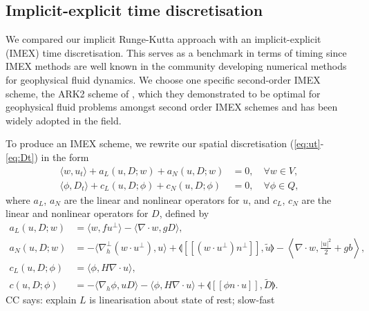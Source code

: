 \documentclass[a4paper, 12pt]{article}
\newcommand{\colin}[1]{{\color{blue}CC says: #1}}
\newcommand{\jump}[1]{[\![#1]\!]}
\begin{document}
\subsection{Implicit-explicit time discretisation}

We compared our implicit Runge-Kutta approach with an
implicit-explicit (IMEX) time discretisation. This serves as a
benchmark in terms of timing since IMEX methods are well known in the
community developing numerical methods for geophysical fluid dynamics.
We choose one specific second-order IMEX scheme, the ARK2 scheme
of \citet{giraldo2013implicit}, which they demonstrated to be optimal
for geophysical fluid problems amongst second order IMEX schemes and has
been widely adopted in the field.

To produce an IMEX scheme, we rewrite our spatial discretisation
(\ref{eq:ut}-\ref{eq:Dt}) in the form
\begin{align}
  \label{eq:ut IMEX}
  \langle w, u_t \rangle + a_L(u,D;w) 
  + a_N(u,D;w) 
   & = 0,
  \quad \forall w \in V, \\
  \label{eq:Dt IMEX}
  \langle \phi, D_t \rangle
+ c_L(u,D; \phi) + c_N(u,D; \phi)  & =
 0, \quad \forall \phi \in Q,
\end{align}
where $a_L$, $a_N$ are the linear and nonlinear operators for $u$,
and $c_L$, $c_N$ are the linear and nonlinear operators for $D$,
defined by
\begin{align}
  a_L(u,D;w) & = \langle w, fu^\perp \rangle - \langle \nabla\cdot w,
  gD \rangle, \\
   a_N(u,D;w) 
&=
  - \langle \nabla_h^\perp (w\cdot u^\perp), u \rangle
  + \llangle \jump{(w\cdot u^\perp) n^\perp}, \tilde{u} \rrangle  - \left\langle \nabla\cdot w, \frac{|u|^2}{2} + gb \right\rangle, \\
  c_L(u,D;\phi) & = \langle \phi, H\nabla\cdot u\rangle, \\
  c(u,D; \phi) &=
  - \langle \nabla_h \phi, uD \rangle
  - \langle \phi, H\nabla\cdot u\rangle
  + \llangle \jump{\phi n\cdot u}, \tilde{D} \rrangle.
\end{align}
\colin{explain $L$ is linearisation about state of rest; slow-fast}
\end{document}
